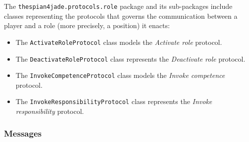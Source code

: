 The \texttt{thespian4jade.protocols.role} package and its sub-packages include classes representing the protocols that governs the communication between a player and a role (more precisely, a position) it enacts:
\begin{itemize}
	\item The \texttt{ActivateRoleProtocol} class models the \textit{Activate role} protocol.
	\item The \texttt{DeactivateRoleProtocol} class represents the \textit{Deactivate role} protocol.
	\item The \texttt{InvokeCompetenceProtocol} class models the \textit{Invoke competence} protocol.
	\item The \texttt{InvokeResponsibilityProtocol} class represents the \textit{Invoke responsibility} protocol.
\end{itemize}

\subsubsection{Messages}

